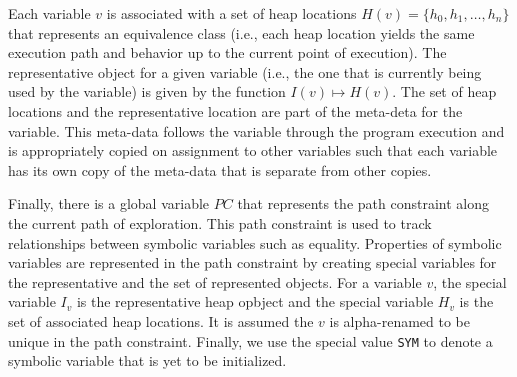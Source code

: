 Each variable $v$ is associated with a set of heap locations $H(v) = \{h_0, h_1, \ldots, h_n\}$ that represents an equivalence class (i.e., each heap location yields the same execution path and behavior up to the current point of execution).  The representative object for a given variable (i.e., the one that is currently being used by the variable) is given by the function $I(v) \mapsto H(v)$. The set of heap locations and the representative location are part of the meta-deta for the variable. This meta-data follows the variable through the program execution and is appropriately copied on assignment to other variables such that each variable has its own copy of the meta-data that is separate from other copies.

Finally, there is a global variable $\mathit{PC}$ that represents the path constraint along the current path of exploration. This path constraint is used to track relationships between symbolic variables such as equality. Properties of symbolic variables are represented in the path constraint by creating special variables for the representative and the set of represented objects. For a variable $v$, the special variable $I_v$ is the representative heap opbject and the special variable $H_v$ is the set of associated heap locations. It is assumed the $v$ is alpha-renamed to be unique in the path constraint. Finally, we use the special value \texttt{SYM} to denote a symbolic variable that is yet to be initialized.

